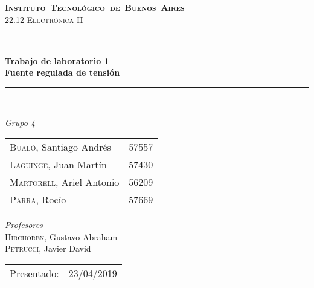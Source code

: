 \begin{titlepage}
\newcommand{\HRule}{\rule{\linewidth}{0.5mm}}
\center
\mbox{\textsc{\LARGE \bfseries {Instituto Tecnol\'ogico de Buenos Aires}}}\\[1.5cm]
\textsc{\Large 22.12 Electr\'onica II}\\[0.5cm]


\HRule \\[0.6cm]
{ \Huge \bfseries Trabajo de laboratorio 1
\\ Fuente regulada de tensi\'on}\\[0.4cm] %
\HRule \\[1.5cm]


{\large

\emph{Grupo 4}\\
\vspace{3px}

\begin{tabular}{lr} 	
\textsc{Bual\'o}, Santiago Andr\'es  & 57557 \\
\textsc{Laguinge}, Juan Mart\'in  & 57430 \\
\textsc{Martorell}, Ariel Antonio  & 56209 \\
\textsc{Parra}, Roc\'io  & 57669 \\
\end{tabular}

\vspace{20px}

\emph{Profesores}\\
\vspace{3px}
\textsc{Hirchoren}, Gustavo Abraham\\ 	
\textsc{Petrucci}, Javier David\\ 	

\vspace{100px}

\begin{tabular}{ll}

Presentado: & 23/04/2019\\

\end{tabular}

}

\vfill

\end{titlepage}